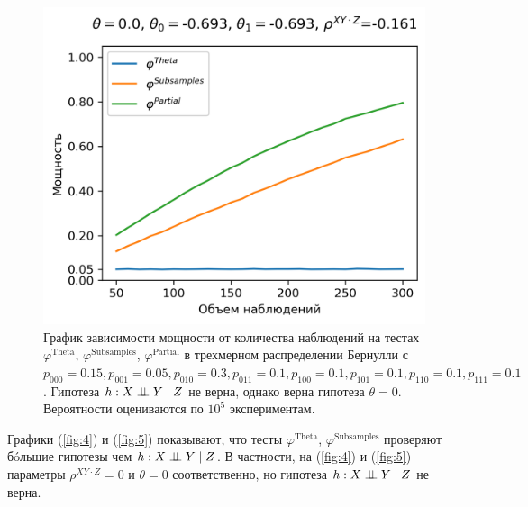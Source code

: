 \begin{figure}[H]
    \centering
    \includegraphics[scale=0.6]{images/graph5.png}
    \caption{График зависимости мощности от количества наблюдений
    на тестах $\varphi^{\text{Theta}}$, $\varphi^{\text{Subsamples}}$, $\varphi^{\text{Partial}}$
    в трехмерном распределении Бернулли с $p_{000}=0.15, p_{001}=0.05, 
    p_{010}=0.3, p_{011}=0.1,
    p_{100}=0.1, p_{101}=0.1, p_{110}=0.1, p_{111}=0.1$. 
    Гипотеза $h: X \perp\!\!\!\perp Y \mid Z$ не верна, однако верна гипотеза $\theta=0$.
    Вероятности оцениваются по $10^5$ экспериментам.} \label{fig:5}
\end{figure}

Графики (\autoref{fig:4}) и (\autoref{fig:5}) показывают, что тесты 
$\varphi^{\text{Theta}}$, $\varphi^{\text{Subsamples}}$
проверяют бóльшие гипотезы чем $h: X \perp\!\!\!\perp Y \mid Z$.
В частности, на (\autoref{fig:4}) и (\autoref{fig:5})
параметры $\rho^{XY\cdot Z}=0$ и $\theta=0$ соответственно, но гипотеза
$h: X \perp\!\!\!\perp Y \mid Z$ не верна.


